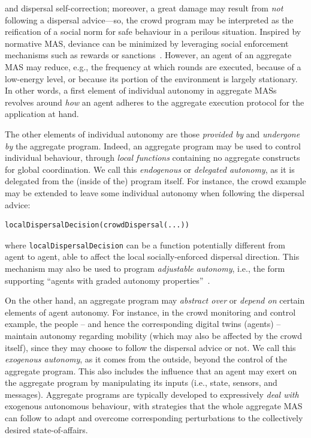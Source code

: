  and dispersal self-correction; moreover, a great damage may result from \emph{not} following a dispersal advice---so, the crowd program may be interpreted as the reification of a social norm for safe behaviour in a perilous situation.
%
Inspired by normative MAS, deviance can be minimized
 by leveraging social enforcement mechanisms
 such as rewards or sanctions~\cite{DBLP:journals/jasss/HollanderW11}.
%
However, an agent of an aggregate MAS may reduce, e.g.,
 the frequency at which rounds are executed,
 because of a low-energy level,
 or because its portion of the environment 
 is largely stationary.
%
In other words,
 a first element of individual autonomy in aggregate MASs
 revolves around \emph{how}
 an agent adheres to the aggregate execution protocol
 for the application at hand.

The other elements of individual autonomy
 are those \emph{provided by} and \emph{undergone by}
 the aggregate program.
%
Indeed, an aggregate program may be used to 
 control individual behaviour,
 through \emph{local functions}
 containing no aggregate constructs for global coordination.
%
We call this \emph{endogenous} or \emph{delegated autonomy},
 as it is delegated from the (inside of the) program itself.
%
For instance, the crowd example may be extended to leave some individual autonomy when following the dispersal advice:
\begin{lstlisting}
localDispersalDecision(crowdDispersal(...))
\end{lstlisting}
%
where \lstinline|localDispersalDecision| can be a function potentially different from agent to agent, able to affect the local socially-enforced dispersal direction.
%
This mechanism may also be used to program \emph{adjustable autonomy}, i.e., the form 
 supporting ``agents with graded autonomy properties''~\cite{DBLP:journals/air/MostafaAM19}.

On the other hand, an aggregate program may \emph{abstract over} or \emph{depend on} certain elements of agent autonomy.
%
For instance, in the crowd monitoring and control example,
 the people -- and hence the corresponding digital twins (agents) --
 maintain autonomy regarding mobility (which may also be affected by the crowd itself), since they may choose to follow the dispersal advice or not.
%
We call this \emph{exogenous autonomy},
 as it comes from the outside,
 beyond the control of the aggregate program.
%
This also includes the influence that an agent
 may exert on the aggregate program
 by manipulating its inputs
 (i.e., state, sensors, and messages).
%
Aggregate programs are typically developed 
 to expressively \emph{deal with} exogenous autonomous behaviour,
 with strategies that the whole aggregate MAS can follow
 to adapt and overcome corresponding perturbations
 to the collectively desired state-of-affairs.
%


